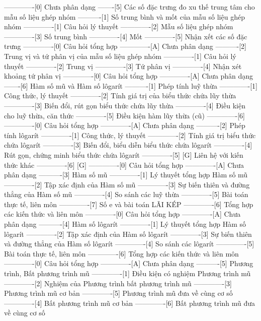 -------------[0] Chưa phân dạng
-------[5] Các số đặc trưng đo xu thế trung tâm cho mẫu số liệu ghép nhóm
----------[1] Số trung bình và mốt của mẫu số liệu ghép nhóm
-------------[1] Câu hỏi lý thuyết
-------------[2] Mẫu số liệu ghép nhóm
-------------[3] Số trung bình
-------------[4] Mốt
-------------[5] Nhận xết các số đặc trưng
-------------[0] Câu hỏi tổng hợp
-------------[A] Chưa phân dạng
----------[2] Trung vị và tứ phân vị của mẫu số liệu ghép nhóm
-------------[1] Câu hỏi lý thuyết
-------------[2] Trung vị
-------------[3] Tứ phân vị
-------------[4] Nhận xét khoảng tứ phân vị
-------------[0] Câu hỏi tổng hợp
-------------[A] Chưa phân dạng
-------[6] Hàm số mũ và Hàm số lôgarít
----------[1] Phép tính luỹ thừa
-------------[1] Công thức, lý thuyết
-------------[2] Tính giá trị của biểu thức chứa lũy thừa
-------------[3] Biến đổi, rút gọn biểu thức chứa lũy thừa
-------------[4] Điều kiện cho luỹ thừa, căn thức
-------------[5] Điều kiện hàm lũy thừa (cũ)
-------------[6] 
-------------[0] Câu hỏi tổng hợp
-------------[A] Chưa phân dạng
----------[2] Phép tính lôgarít
-------------[1] Công thức, lý thuyết
-------------[2] Tính giá trị biểu thức chứa lôgarít
-------------[3] Biến đổi, biểu diễn biểu thức chứa lôgarít
-------------[4] Rút gọn, chứng minh biểu thức chứa lôgarít
-------------[5] [G] Liên hệ với kiến thức khác
-------------[6] [G]
-------------[0] Câu hỏi tổng hợp
-------------[A] Chưa phân dạng
----------[3] Hàm số mũ
-------------[1] Lý thuyết tổng hợp Hàm số mũ
-------------[2] Tập xác định của Hàm số mũ
-------------[3] Sự biến thiên và đường thẳng của Hàm số mũ
-------------[4] So sánh các luỹ thừa
-------------[5] Bài toán thực tế, liên môn
-------------[7] Số e và bài toán LÃI KÉP
-------------[6] Tổng hợp các kiến thức và liên môn
-------------[0] Câu hỏi tổng hợp
-------------[A] Chưa phân dạng
----------[4] Hàm số lôgarít
-------------[1] Lý thuyết tổng hợp Hàm số lôgarít
-------------[2] Tập xác định của Hàm số lôgarít
-------------[3] Sự biến thiên và đường thẳng của Hàm số lôgarít
-------------[4] So sánh các lôgarít
-------------[5] Bài toán thực tế, liên môn
-------------[6] Tổng hợp các kiến thức và liên môn
-------------[0] Câu hỏi tổng hợp
-------------[A] Chưa phân dạng
----------[5] Phương trình, Bất phương trình  mũ 
-------------[1] Điều kiện có nghiệm Phương trình mũ
-------------[2] Nghiệm của Phương trình bất phương trình mũ
-------------[3] Phương trình mũ cơ bản
-------------[5] Phương trình mũ đưa về cùng cơ số
-------------[4] Bất phương trình mũ cơ bản
-------------[6] Bất phương trình mũ đưa về cùng cơ số
